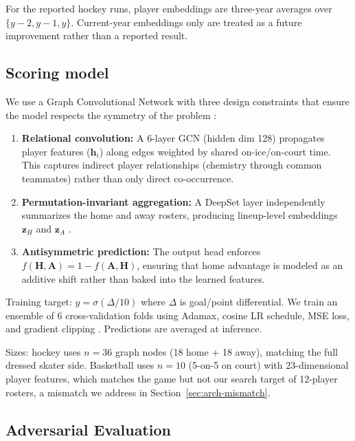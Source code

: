 \documentclass[11pt,letterpaper]{article}
\begin{document}
For the reported hockey runs, player embeddings are three-year averages
over $\{y-2, y-1, y\}$. Current-year embeddings only are treated as a
future improvement rather than a reported result.

\subsection{Scoring model}

We use a Graph Convolutional Network with three design constraints that
ensure the model respects the symmetry of the problem
\citep{kipf2017gcn}:

\begin{enumerate}[leftmargin=*]
  \item \textbf{Relational convolution:} A 6-layer GCN (hidden dim 128)
    propagates player features ($\mathbf{h}_i$) along edges weighted by
    shared on-ice/on-court time. This captures indirect player
    relationships (chemistry through common teammates) rather than only
    direct co-occurrence.
  \item \textbf{Permutation-invariant aggregation:} A DeepSet layer
    independently summarizes the home and away rosters, producing
    lineup-level embeddings $\mathbf{z}_H$ and $\mathbf{z}_A$
    \citep{zaheer2017deepsets}.
  \item \textbf{Antisymmetric prediction:} The output head enforces
    $f(\mathbf{H}, \mathbf{A}) = 1 - f(\mathbf{A}, \mathbf{H})$,
    ensuring that home advantage is modeled as an additive shift rather
    than baked into the learned features.
\end{enumerate}

Training target: $y = \sigma(\Delta / 10)$ where $\Delta$ is goal/point
differential. We train an ensemble of 6 cross-validation folds using
Adamax, cosine LR schedule, MSE loss, and gradient clipping
\citep{kingma2015adam,loshchilov2017sgdr}. Predictions are averaged at
inference.

Sizes: hockey uses $n = 36$ graph nodes (18 home + 18 away), matching
the full dressed skater side. Basketball uses $n = 10$ (5-on-5 on
court) with $23$-dimensional player features, which matches the game
but not our search target of 12-player rosters, a mismatch we address
in Section~\ref{sec:arch-mismatch}.

\subsection{Adversarial Evaluation}
\end{document}

